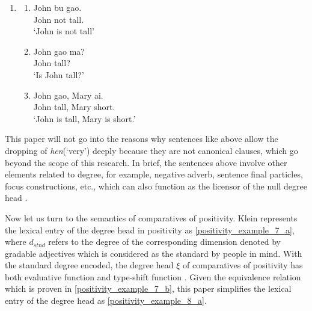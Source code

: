 \documentclass{ctexart}
\let \cite \parencite
\begin{document}
\begin{enumerate}
    \item \label{positivity_example_6}
    \begin{enumerate}
        \item \label{positivity_example_6_a}
        John bu gao. \\
        John not tall. \\
        `John is not tall' 

        \item \label{positivity_example_6_b}
        John gao ma? \\
        John tall? \\
        `Is John tall?' 

        \item \label{positivity_example_6_c}
        John gao, Mary ai. \\
        John tall, Mary short. \\
        `John is tall, Mary is short.' 

    \end{enumerate}
\end{enumerate}

This paper will not go into the reasons why sentences like above allow the dropping of \textit{hen}(`very') deeply because they are not canonical clauses, which go beyond the scope of this research. In brief, the sentences above involve other elements related to degree, for example, negative adverb, sentence final particles, focus constructions, etc., which can also function as the licensor of the null degree head \cite{hu2005}.

Now let us turn to the semantics of comparatives of positivity. Klein \cite{klein1980semantics} represents the lexical entry of the degree head in positivity as \ref{positivity_example_7_a}, where $d_{stnd}$ refers to the degree of the corresponding dimension denoted by gradable adjectives which is considered as the standard by people in mind. With the standard degree encoded, the degree head $\xi$ of comparatives of positivity has both evaluative function and type-shift function \cite{rett2014semantics}. Given the equivalence relation which is proven in \ref{positivity_example_7_b}, this paper simplifies the lexical entry of the degree head as \ref{positivity_example_8_a}.
\end{document}
